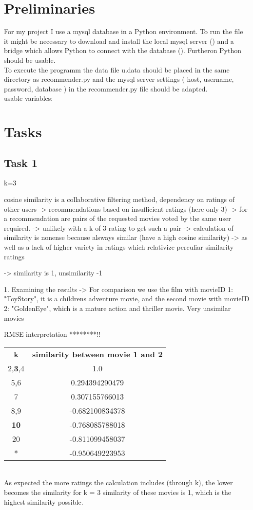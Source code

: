 \documentclass[a4paper,10pt,twoside]{article}
\begin{document}
\section{Preliminaries}
For my project I use a mysql database in a Python environment. To run the file it might be necessary to download and install the local mysql server (\url{}) and a bridge which allows Python to connect with the database (\url{}). Furtheron Python should be usable.\\
To execute the programm the data file u.data should be placed in the same directory as recommender.py and the mysql server settings ( host, username, password, database ) in the recommender.py file should be adapted.\\
usable variables:

\section{Tasks}
\subsection{Task 1}
k=3


cosine similarity is a collaborative filtering method, dependency on ratings of other users
-> recommendations based on insufficient ratings (here only 3)
-> for a recommendation are pairs of the requested movies voted by the same user required.
-> unlikely with a k of 3 rating to get such a pair -> calculation of similarity is nonense because alsways similar (have a high cosine similarity)
-> as well as a lack of higher variety in ratings which relativize perculiar similarity ratings

-> similarity is 1, unsimilarity -1

1. Examining the results
-> For comparison we use the film with movieID 1: "ToyStory", it is a childrens adventure movie, and the second movie with movieID 2: "GoldenEye", which is a mature action and thriller movie.
Very unsimilar movies

RMSE interpretation ********!!
\\

\begin{tabular}{cc}
	\textbf{k} & \textbf{similarity between movie 1 and 2} \\
	2,\textbf{3},4 & 1.0 \\
	5,6 & 0.294394290479\\
	7& 0.307155766013\\
	8,9 & -0.682100834378\\
	\textbf{10} & -0.768085788018\\
	20 & -0.811099458037\\
	* & -0.950649223953\\
\end{tabular} \\
As expected the more ratings the calculation includes (through k), the lower becomes the similarity
for k = 3 similarity of these movies is 1, which is the highest similarity possible.
\end{document}

